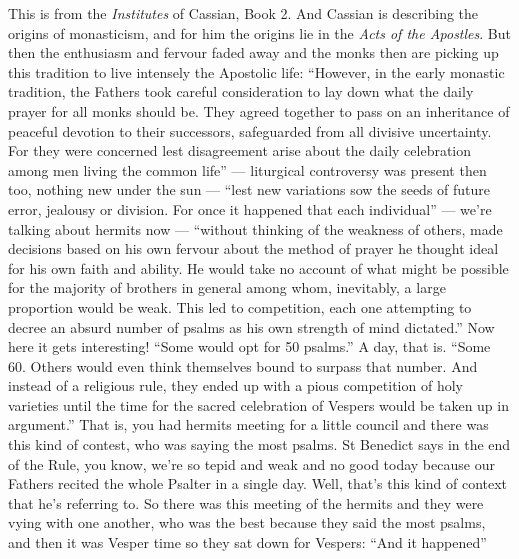 This is from the \emph{Institutes} of Cassian, Book 2. And Cassian is describing the origins of monasticism, and for him the origins lie in the \emph{Acts of the Apostles}. But then the enthusiasm and fervour faded away and the monks then are picking up this tradition to live intensely the Apostolic life: ``However, in the early monastic tradition, the Fathers took careful consideration to lay down what the daily prayer for all monks should be. They agreed together to pass on an inheritance of peaceful devotion to their successors, safeguarded from all divisive uncertainty. For they were concerned lest disagreement arise about the daily celebration among men living the common life'' --- liturgical controversy was present then too, nothing new under the sun --- ``lest new variations sow the seeds of future error, jealousy or division. For once it happened that each individual'' --- we're talking about hermits now --- ``without thinking of the weakness of others, made decisions based on his own fervour about the method of prayer he thought ideal for his own faith and ability. He would take no account of what might be possible for the majority of brothers in general among whom, inevitably, a large proportion would be weak. This led to competition, each one attempting to decree an absurd number of psalms as his own strength of mind dictated.'' Now here it gets interesting! ``Some would opt for 50 psalms.'' A day, that is. ``Some 60. Others would even think themselves bound to surpass that number. And instead of a religious rule, they ended up with a pious competition of holy varieties until the time for the sacred celebration of Vespers would be taken up in argument.'' That is, you had hermits meeting for a little council and there was this kind of contest, who was saying the most psalms. St Benedict says in the end of the Rule, you know, we're so tepid and weak and no good today because our Fathers recited the whole Psalter in a single day. Well, that's this kind of context that he's referring to. So there was this meeting of the hermits and they were vying with one another, who was the best because they said the most psalms, and then it was Vesper time so they sat down for Vespers: ``And it happened''









